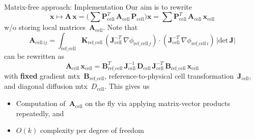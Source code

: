 \documentclass[svgnames]{beamer} %
\newcommand{\vect}[1]{\boldsymbol{\mathbf{#1}}}
\begin{document}
	\begin{frame}{Matrix-free approach: Implementation}
		Our aim is to rewrite
		$$
			\vect x \mapsto \vect A\,\vect x = \big(\sum \vect P^T_\text{cell}\,\vect A_\text{cell}\,\vect P_\text{cell}\big)\vect x = \sum \vect P^T_\text{cell}\,\vect A_\text{cell}\,\vect x_\text{cell}
		$$
		w/o storing local matrices~$\vect A_\text{cell}$. Note that
		$$
			\vect A_{\text{cell}\,ij} = \int_\text{ref\_cell} \vect K_\text{ref\_cell}\,(\vect J^{-T}_\text{cell}\,\nabla\phi_{\text{ref\_cell}\,j})\cdot(\vect J^{-T}_\text{cell}\,\nabla\phi_{\text{ref\_cell}\,i})\,|\text{det}\,
			\vect J|
		$$
		can be rewritten as
		$$
			\vect A_\text{cell}\,\vect x_\text{cell} = \vect B^{T}_\text{ref\_cell}\,\vect J^{-1}_\text{cell}\,\vect D_\text{cell}\,\vect J^{-T}_\text{cell}\,\vect B_\text{ref\_cell}\,\vect x_\text{cell}
		$$
		with \textbf{fixed} gradient mtx~$\vect B_\text{ref\_cell}$, reference-to-physical cell transformation~$\vect J_\text{cell}$, and diagonal diffusion mtx~$D_\text{cell}$. This gives us
		\begin{itemize}
			\item Computation of~$\vect A_\text{cell}$ on the fly via applying matrix-vector products repeatedly, and
			\item $O(k)$ complexity per degree of freedom
		\end{itemize}
	\end{frame}	
	
\end{document}
